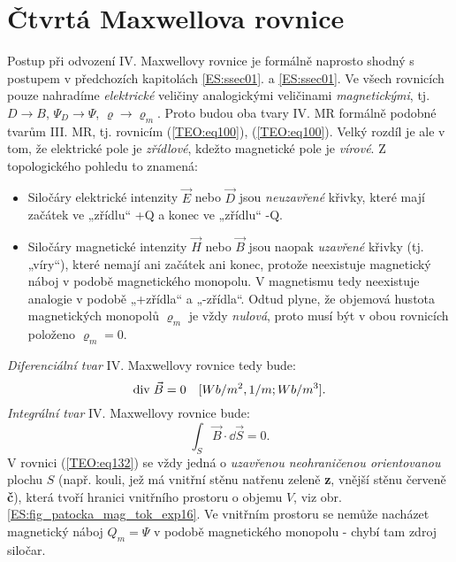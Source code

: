   \section{Čtvrtá Maxwellova rovnice}\label{ES:sec09}
    Postup při odvození IV. Maxwellovy rovnice je formálně naprosto shodný s postupem v předchozích 
    kapitolách \ref{ES:ssec01}. a \ref{ES:ssec01}. Ve všech rovnicích pouze nahradíme 
    \emph{elektrické} veličiny analogickými veličinami \emph{magnetickými}, tj. \(D\rightarrow 
    B\), \(\Psi_D\rightarrow \Psi\), \(\varrho\rightarrow \varrho_m\). Proto budou oba 
    tvary IV. MR formálně podobné tvarům III. MR, tj. rovnicím (\ref{TEO:eq100}), 
    (\ref{TEO:eq100}). Velký rozdíl je ale v tom, že elektrické pole je \emph{zřídlové}, 
    kdežto magnetické pole je \emph{vírové}. Z topologického pohledu to znamená:
    \begin{itemize}[noitemsep]
      \item Siločáry elektrické intenzity \(\vec{E}\) nebo \(\vec{D}\) jsou \emph{neuzavřené} 
            křivky, které mají začátek ve „zřídlu“ +Q a konec ve „zřídlu“ -Q.
    
      \item Siločáry magnetické intenzity \(\vec{H}\) nebo \(\vec{B}\) jsou naopak \emph{uzavřené} 
            křivky (tj. „víry“), které  nemají ani začátek ani konec, protože neexistuje magnetický 
            náboj v podobě magnetického monopolu. V magnetismu tedy neexistuje analogie v podobě 
            „+zřídla“ a „-zřídla“. Odtud plyne, že objemová hustota magnetických monopolů 
            \(\varrho_m\) je vždy \emph{nulová}, proto musí být v obou rovnicích položeno 
            \(\varrho_m = 0\).
    \end{itemize}
    \emph{Diferenciální tvar} IV. Maxwellovy rovnice tedy bude:
    \begin{equation*}
      \mathrm{div}\;\vec{B} = 0 \quad [Wb/m^2,1/m; Wb/m^3].
    \end{equation*}
    \emph{Integrální tvar} IV. Maxwellovy rovnice bude:
    \begin{equation}\label{TEO:eq132}
      \int_S\vec{B}\cdot \dd{\vec{S}} = 0.
    \end{equation}    
    V rovnici (\ref{TEO:eq132}) se vždy jedná o \emph{uzavřenou neohraničenou orientovanou} 
    plochu \(S\) (např. kouli, jež má vnitřní stěnu natřenu zeleně \textbf{z}, vnější stěnu červeně 
    \textbf{č}), která tvoří hranici vnitřního prostoru o objemu \(V\), viz obr. 
    \ref{ES:fig_patocka_mag_tok_exp16}. Ve vnitřním prostoru se nemůže nacházet magnetický náboj 
    \(Q_m = \Psi\) v podobě magnetického monopolu - chybí tam zdroj siločar.
   
